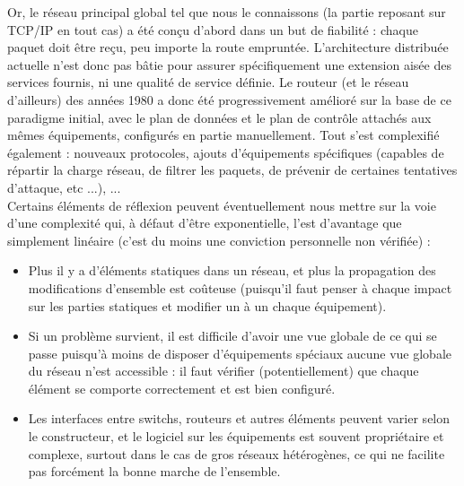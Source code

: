 Or, le réseau principal global tel que nous le connaissons (la partie reposant sur TCP/IP en tout cas) a été conçu d'abord dans un but de fiabilité : chaque paquet doit être reçu, peu importe la route empruntée. L'architecture distribuée actuelle n'est donc pas bâtie pour assurer spécifiquement une extension aisée des services fournis, ni une qualité de service définie. Le routeur (et le réseau d'ailleurs) des années 1980 a donc été progressivement amélioré sur la base de ce paradigme initial, avec le plan de données et le plan de contrôle attachés aux mêmes équipements, configurés en partie manuellement. Tout s'est complexifié également : nouveaux protocoles, ajouts d'équipements spécifiques (capables de répartir la charge réseau, de filtrer les paquets, de prévenir de certaines tentatives d'attaque, etc ...), ...\\
Certains éléments de réflexion peuvent éventuellement nous mettre sur la voie d'une complexité qui, à défaut d'être exponentielle, l'est d'avantage que simplement linéaire (c'est du moins une conviction personnelle non vérifiée) :

\begin{itemize}
\item Plus il y a d'éléments statiques dans un réseau, et plus la propagation des modifications d'ensemble est coûteuse (puisqu'il faut penser à chaque impact sur les parties statiques et modifier un à un chaque équipement).
\item Si un problème survient, il est difficile d'avoir une vue globale de ce qui se passe puisqu'à moins de disposer d'équipements spéciaux aucune vue globale du réseau n'est accessible : il faut vérifier (potentiellement) que chaque élément se comporte correctement et est bien configuré.
\item Les interfaces entre switchs, routeurs et autres éléments peuvent varier selon le constructeur, et le logiciel sur les équipements est souvent propriétaire et complexe, surtout dans le cas de gros réseaux hétérogènes, ce qui ne facilite pas forcément la bonne marche de l'ensemble.
\end{itemize}

